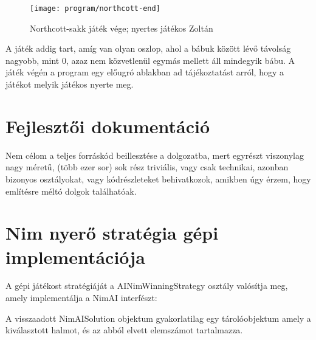 \begin{figure}[!ht]
	\texttt{[image: program/northcott-end]}
	\centering
	\caption{Northcott-sakk játék vége; nyertes játékos Zoltán}
	\label{fig:northcott-end}
\end{figure}

A játék addig tart, amíg van olyan oszlop, ahol a bábuk között lévő távolság nagyobb, mint 0, azaz nem közvetlenül egymás mellett áll mindegyik bábu. A játék végén a program egy előugró ablakban ad tájékoztatást arról, hogy a játékot melyik játékos nyerte meg.


\section{Fejlesztői dokumentáció}

Nem célom a teljes forráskód beillesztése a dolgozatba, mert egyrészt viszonylag nagy méretű, (több ezer sor) sok rész triviális, vagy csak technikai, azonban bizonyos osztályokat, vagy kódrészleteket behivatkozok, amikben úgy érzem, hogy említésre méltó dolgok találhatóak.

\section{Nim nyerő stratégia gépi implementációja}
A gépi játékost stratégiáját a AINimWinningStrategy osztály valósítja meg, amely implementálja a NimAI interfészt:


A visszaadott NimAISolution objektum gyakorlatilag egy tárolóobjektum amely a kiválasztott halmot, és az abból elvett elemszámot tartalmazza.

